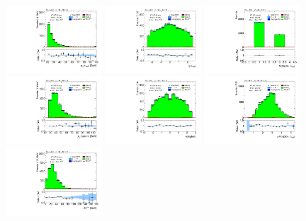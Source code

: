 \begin{figure}[tp]
  \centering
  \includegraphics[width=0.32\textwidth]{figures/analysis/vbf-QCDCR/tau-pt}
  \includegraphics[width=0.32\textwidth]{figures/analysis/vbf-QCDCR/tau-eta}
  \includegraphics[width=0.32\textwidth]{figures/analysis/vbf-QCDCR/tau-numTrack}
  \includegraphics[width=0.32\textwidth]{figures/analysis/vbf-QCDCR/lep-pt-hi}
  \includegraphics[width=0.32\textwidth]{figures/analysis/vbf-QCDCR/lep-eta}
  \includegraphics[width=0.32\textwidth]{figures/analysis/vbf-QCDCR/taulep-dR}
  \includegraphics[width=0.32\textwidth]{figures/analysis/vbf-QCDCR/met-pt-hi}

\end{figure}
